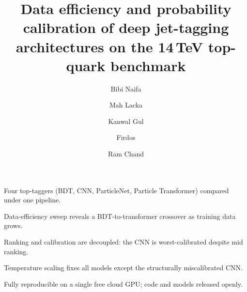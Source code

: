 \documentclass[preprint,12pt]{elsarticle}
\begin{document}
\begin{frontmatter}

\begin{highlights}
\item Four top-taggers (BDT, CNN, ParticleNet, Particle Transformer) compared under one pipeline.
\item Data-efficiency sweep reveals a BDT-to-transformer crossover as training data grows.
\item Ranking and calibration are decoupled: the CNN is worst-calibrated despite mid ranking.
\item Temperature scaling fixes all models except the structurally miscalibrated CNN.
\item Fully reproducible on a single free cloud GPU; code and models released openly.
\end{highlights}

\title{Data efficiency and probability calibration of deep
jet-tagging architectures on the 14\,TeV top-quark benchmark}

\author[bnbwu]{Bibi Naifa}
\author[bnbwu]{Mah Lacka}
\author[bnbwu]{Kanwal Gul}
\author[bnbwu]{Firdos}
\author[bnbwu]{Ram Chand}



\end{frontmatter}
\end{document}
